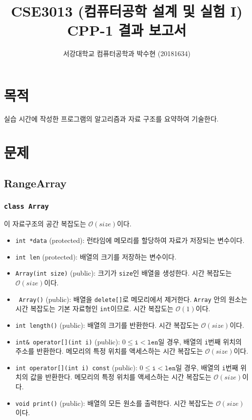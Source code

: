 
	


\title{CSE3013 (컴퓨터공학 설계 및 실험 I) \space \newline CPP-1 결과 보고서}
\author{서강대학교 컴퓨터공학과 박수현 (20181634)}
\maketitle

\section{목적}
실습 시간에 작성한 프로그램의 알고리즘과 자료 구조를 요약하여 기술한다.

\section{문제}

\subsection{RangeArray}

\subsubsection{\texttt{class Array}}

이 자료구조의 공간 복잡도는 $\mathcal{O}\left(size\right)$이다.

\begin{itemize}
	\item \texttt{int *data} (protected): 런타임에 메모리를 할당하여 자료가 저장되는 변수이다.
	\item \texttt{int len} (protected): 배열의 크기를 저장하는 변수이다.
	\item \texttt{Array(int size)} (public): 크기가 \texttt{size}인 배열을 생성한다. 시간 복잡도는 $\mathcal{O}\left(size\right)$이다.
	\item \texttt{~Array()} (public): 배열을 \texttt{delete[]}로 메모리에서 제거한다. \texttt{Array} 안의 원소는 시간 복잡도는 기본 자료형인 \texttt{int}이므로. 시간 복잡도는 $\mathcal{O}\left(1\right)$이다.
	\item \texttt{int length()} (public): 배열의 크기를 반환한다. 시간 복잡도는 $\mathcal{O}\left(size\right)$이다.
	\item \texttt{int& operator[](int i)} (public): $0 \leq \texttt{i} < \texttt{len}$일 경우, 배열의 \texttt{i}번째 위치의 주소를 반환한다. 메모리의 특정 위치를 액세스하는 시간 복잡도는 $\mathcal{O}\left(size\right)$이다.
	\item \texttt{int operator[](int i) const} (public): $0 \leq \texttt{i} < \texttt{len}$일 경우, 배열의 \texttt{i}번째 위치의 값을 반환한다. 메모리의 특정 위치를 액세스하는 시간 복잡도는 $\mathcal{O}\left(size\right)$이다.
	\item \texttt{void print()} (public): 배열의 모든 원소를 출력한다. 시간 복잡도는 $\mathcal{O}\left(size\right)$이다.
\end{itemize}

